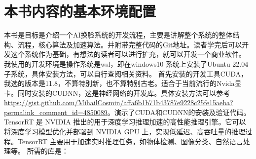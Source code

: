 \chapter{本书内容的基本环境配置}
本书是目标是介绍一个AI换脸系统的开发流程，主要是讲解整个系统的整体结构、流程，核心算法及加速算法。并附带完整代码的Git地址。读者学完后可以开发这个系统作为基础，有想法的读者可以进行扩充，就可以开发一个商业软件。
我使用的开发环境是操作系统是wsl，即在windows10 系统上安装了Ubuntu 22.04子系统，具体安装方法，可以自行查阅相关资料。
首先安装的开发工具CUDA，我选的版本是11.8，不算特别新，也不算特别古老。适合于当前流行的Nvida显卡。同时安装的CUDNN，这是神经网络的开发库。具体安装方法可以参考\url{https://gist.github.com/MihailCosmin/affa6b1b71b43787e9228c25fe15aeba?permalink_comment_id=4850089}。演示了CUDA和CUDNN的安装及验证代码。
TensorRT 是 NVIDIA 推出的用于深度学习推理加速的高性能推理引擎。它可以将深度学习模型优化并部署到 NVIDIA GPU 上，实现低延迟、高吞吐量的推理过程。TensorRT 主要用于加速实时推理任务，如物体检测、图像分类、自然语言处理等。
所需的库是：
